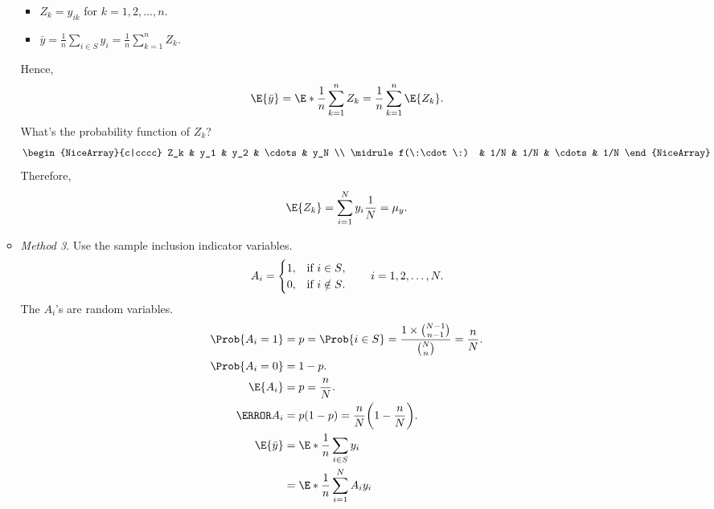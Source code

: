 \begin{Result}{}
\begin{enumerate}[(a)]
\begin{itemize}
\begin{itemize}
                            \item $ Z_k=y_{ik} $ for $k=1,2,\ldots,n$.
                            \item $ \bar{y}=\frac{1}{n}\sum_{i\in S}y_i=\frac{1}{n}\sum_{k=1}^{n}Z_k $.
                        \end{itemize}
                        Hence,
                        \[ \E{\bar{y}}=\E*{\frac{1}{n}\sum_{k=1}^n Z_k}
                            =\frac{1}{n}\sum_{k=1}^{n}\E{Z_k}. \]
                        What's the probability function of $ Z_k $?
                        \[ \begin{NiceArray}{c|cccc}
                                Z_k          & y_1 & y_2 & \cdots & y_N \\
                                \midrule
                                f(\:\cdot\:) & 1/N & 1/N & \cdots & 1/N
                            \end{NiceArray} \]
                        Therefore,
                        \[ \E{Z_k}=\sum_{i=1}^{N}y_i \frac{1}{N}=\mu_y. \]
                  \item \emph{Method 3}. Use the sample inclusion indicator variables.
                        \[ A_i=\begin{cases}
                                1, & \text{if $ i\in S $},    \\
                                0, & \text{if $ i\notin S $}.
                            \end{cases}\qquad i=1,2,\ldots,N. \]
                        The $ A_i $'s are random variables.
                        \begin{align*}
                            \Prob{A_i=1} & =p=\Prob{i\in S}=\frac{1\times \binom{N-1}{n-1}}{\binom{N}{n}}=\frac{n}{N}. \\
                            \Prob{A_i=0} & =1-p.                                                                       \\
                            \E{A_i}      & =p=\frac{n}{N}.                                                             \\
                            \V{A_i}      & =p(1-p)=\frac{n}{N}\biggl(1-\frac{n}{N}\biggr).                             \\
                            \E{\bar{y}}  & =\E*{\frac{1}{n}\sum_{i\in S}y_i}                                           \\
                                         & =\E*{\frac{1}{n}\sum_{i=1}^{N}A_i y_i}                                      \\

\end{align*}
\end{itemize}
\end{enumerate}
\end{Result}
